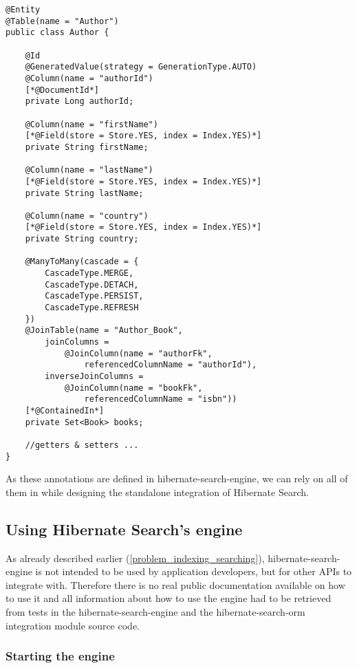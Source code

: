 \lstset{language=java}
\begin{lstlisting}[frame=htrbl, caption={Author.java with Hibernate Search annotations}, label={lst:author.java_2}]
@Entity
@Table(name = "Author")
public class Author {

	@Id
	@GeneratedValue(strategy = GenerationType.AUTO)
	@Column(name = "authorId")
	[*@DocumentId*]
	private Long authorId;
	
	@Column(name = "firstName")
	[*@Field(store = Store.YES, index = Index.YES)*]
	private String firstName;
	
	@Column(name = "lastName")
	[*@Field(store = Store.YES, index = Index.YES)*]
	private String lastName;
	
	@Column(name = "country")
	[*@Field(store = Store.YES, index = Index.YES)*]
	private String country;
	
	@ManyToMany(cascade = {
		CascadeType.MERGE, 
		CascadeType.DETACH, 
		CascadeType.PERSIST, 
		CascadeType.REFRESH
	})
	@JoinTable(name = "Author_Book", 
		joinColumns = 
			@JoinColumn(name = "authorFk", 
				referencedColumnName = "authorId"),
		inverseJoinColumns = 
			@JoinColumn(name = "bookFk", 
				referencedColumnName = "isbn"))
	[*@ContainedIn*]
	private Set<Book> books;
	
	//getters & setters ...
}
\end{lstlisting}
\noindent
As these annotations are defined in hibernate-search-engine, we can rely on all of them in while designing the standalone integration of Hibernate Search.

\subsection{Using Hibernate Search's engine}

As already described earlier (\ref{problem_indexing_searching}), hibernate-search-engine is not intended to be used by application developers, but for other APIs to integrate with. Therefore there is no real public documentation available on how to use it and all information about how to use the engine had to be retrieved from tests in the hibernate-search-engine and the hibernate-search-orm integration module source code.

\subsubsection{Starting the engine}

